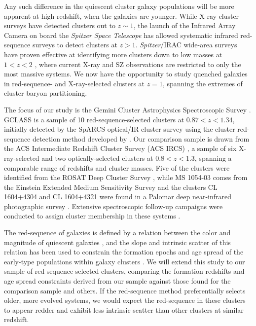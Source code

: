 Any such difference in the quiescent cluster galaxy populations will be more apparent at high redshift, when the galaxies are younger.
While X-ray cluster surveys have detected clusters out to $z \sim 1$, the launch of the Infrared Array Camera \citep[IRAC, ][]{Fazio:2004aa} on board the \textit{Spitzer Space Telescope} \citep{Werner:2004aa} has allowed systematic infrared red-sequence surveys to detect clusters at $z > 1$. {\it Spitzer}/IRAC wide-area surveys have proven effective at identifying more clusters down to low masses at $1  < z < 2$
\citep[e.g.,][]{Papovich:2010yj,Stanford:2012yi,Zeimann:2012bf,muzzin2013,Wylezalek:2013aa,Rettura:2014tt}, where current X-ray and SZ observations are restricted to only the most massive systems. We now have the opportunity to study quenched galaxies in red-sequence- and X-ray-selected clusters at $z = 1$, spanning the extremes of cluster baryon partitioning.

The focus of our study is the Gemini Cluster Astrophysics Spectroscopic Survey \citep[GCLASS \footnote{http://www.faculty.ucr.edu/\~{}gillianw/GCLASS/}, PIs: Wilson \& Yee][]{Muzzin:2012dw}. GCLASS is a sample of 10 red-sequence-selected clusters at $0.87 < z < 1.34$, initially detected by the SpARCS optical/IR cluster survey using the cluster red-sequence detection method developed by \cite{Gladders:2000rq} \citep[see][]{Muzzin:2009jm,Wilson:2009ws,Demarco:2010om}.
Our comparison sample is drawn from the ACS Intermediate Redshift Cluster Survey (ACS IRCS) \citep{fordACS}, a sample of six X-ray-selected and two optically-selected clusters at $0.8 < z < 1.3$, spanning a comparable range of redshifts and cluster masses. Five of the clusters were identified from the ROSAT Deep Cluster Survey \citep{Rosati:1998om}, while MS 1054-03 comes from the Einstein Extended Medium Sensitivity Survey \citep{Gioia:1994rz} and the clusters CL 1604+4304 and CL 1604+4321 were found in a Palomar deep near-infrared photographic survey \citep{Gunn:1986zm}. Extensive spectroscopic follow-up campaigns were conducted to assign cluster membership in these systems \citep[e.g.,][]{Demarco:2005aa,Demarco:2007aa,Holden:2006aa,Gal:2008aa,Rettura:2010aa}.

The red-sequence of galaxies is defined by a relation between the color and magnitude of quiescent galaxies \citep{Bower:1992mb,van-Dokkum:1998wd,Baldry:2004oq,Bell:2004qe}, and the slope and intrinsic scatter of this relation has been used to constrain the formation epochs and age spread of the early-type populations within galaxy clusters \citep{Bower:1998cr,2003ApJ...596L.143B,Mei:2009wt}. We will extend this study to our sample of red-sequence-selected clusters, comparing the formation redshifts and age spread constraints derived from our sample against those found for the comparison sample and others. If the red-sequence method preferentially selects older, more evolved systems, we would expect the red-sequence in these clusters to appear redder and exhibit less intrinsic scatter than other clusters at similar redshift.

